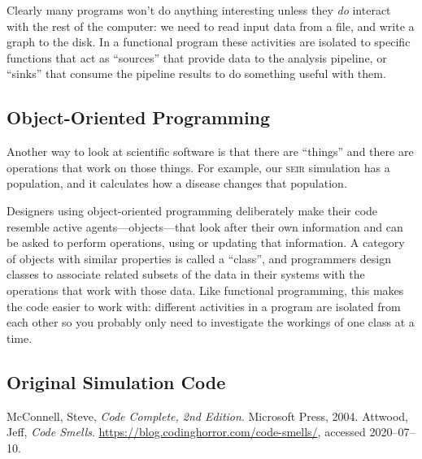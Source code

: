 \documentclass[a4paper]{article}
\begin{document}
Clearly many programs won't do anything interesting unless they \emph{do} interact with the rest of the computer: we need to read input data from a file, and write a graph to the disk. In a functional program these activities are isolated to specific functions that act as ``sources'' that provide data to the analysis pipeline, or ``sinks'' that consume the pipeline results to do something useful with them.

\subsection{Object-Oriented Programming}
Another way to look at scientific software is that there are ``things'' and there are operations that work on those things. For example, our \textsc{seir} simulation has a population, and it calculates how a disease changes that population.

Designers using object-oriented programming deliberately make their code resemble active agents---objects---that look after their own information and can be asked to perform operations, using or updating that information. A category of objects with similar properties is called a ``class'', and programmers design classes to associate related subsets of the data in their systems with the operations that work with those data. Like functional programming, this makes the code easier to work with: different activities in a program are isolated from each other so you probably only need to investigate the workings of one class at a time.

\begin{appendices}
\section{Original Simulation Code\label{code-appendix}}



\end{appendices}

\begin{thebibliography}{9}
   McConnell, Steve, \textit{Code Complete, 2nd Edition}. Microsoft Press, 2004.
   Attwood, Jeff, \textit{Code Smells}. \url{https://blog.codinghorror.com/code-smells/}, accessed 2020--07--10.
\end{thebibliography}
\end{document}
